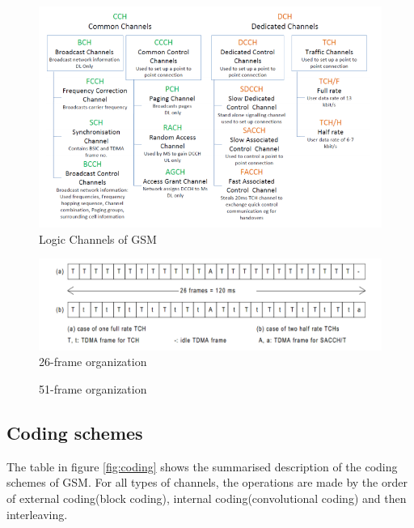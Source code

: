 \documentclass[a4paper,12pt,oneside]{article}
\begin{document}
\begin{figure}[h]
\centering\includegraphics[width=5in]{figure/log_ch.png}
\caption{Logic Channels of GSM \label{fig:2} \cite{glendrange2010decoding}}
\end{figure}
\begin{figure}[h]
\centering\includegraphics[width=5in]{figure/26frames.png}
\caption{ 26-frame organization\label{fig:26f} \cite{etsi199203}}
\end{figure}

\newpage
\begin{figure}[h]

\caption{ 51-frame organization\label{fig:51f} \cite{etsi199203}}
\end{figure}

\newpage


\subsection{Coding schemes}
The table in figure \ref{fig:coding} shows the summarised description of the coding schemes of GSM. For all types of channels, the operations are made by the order of external coding(block coding), internal coding(convolutional coding) and then interleaving.
\end{document}

